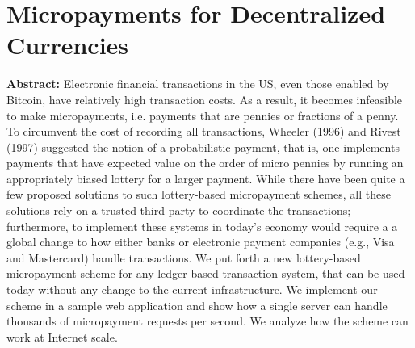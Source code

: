 \section{Micropayments for Decentralized Currencies }

\textbf{Abstract:} 
Electronic financial transactions in the US, even those enabled by Bitcoin, have relatively high transaction costs. As a result, it becomes infeasible to make micropayments, i.e. payments that are pennies or fractions of a penny. To circumvent the cost of recording all transactions, Wheeler (1996) and Rivest (1997) suggested the notion of a probabilistic payment, that is, one implements payments that have expected value on the order of micro pennies by running an appropriately biased lottery for a larger payment. While there have been quite a few proposed solutions to such lottery-based micropayment schemes, all these solutions rely on a trusted third party to coordinate the transactions; furthermore, to implement these systems in today’s economy would require a a global change to how either banks or electronic payment companies (e.g., Visa and Mastercard) handle transactions. We put forth a new lottery-based micropayment scheme for any ledger-based transaction system, that can be used today without any change to the current infrastructure. We implement our scheme in a sample web application and show how a single server can handle thousands of micropayment requests per second. We analyze how the scheme can work at Internet scale.
